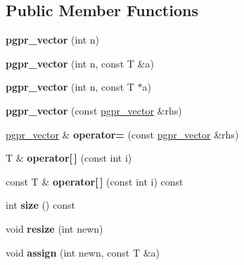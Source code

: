 \subsection*{Public Member Functions}
\begin{DoxyCompactItemize}
\item 
\hypertarget{classpgpr__vector_a4820d76d1faca86e6c3b2eab89b0b142}{{\bfseries pgpr\-\_\-vector} (int n)}\label{classpgpr__vector_a4820d76d1faca86e6c3b2eab89b0b142}

\item 
\hypertarget{classpgpr__vector_a7423667ee0fe3d6b37f648c20ff3e084}{{\bfseries pgpr\-\_\-vector} (int n, const T \&a)}\label{classpgpr__vector_a7423667ee0fe3d6b37f648c20ff3e084}

\item 
\hypertarget{classpgpr__vector_a50c96dc2fbd88b4a9a5ed2a807540422}{{\bfseries pgpr\-\_\-vector} (int n, const T $\ast$a)}\label{classpgpr__vector_a50c96dc2fbd88b4a9a5ed2a807540422}

\item 
\hypertarget{classpgpr__vector_a6135db2460ccc33b4a08b325c25b8517}{{\bfseries pgpr\-\_\-vector} (const \hyperlink{classpgpr__vector}{pgpr\-\_\-vector} \&rhs)}\label{classpgpr__vector_a6135db2460ccc33b4a08b325c25b8517}

\item 
\hypertarget{classpgpr__vector_a989b36f3d36a0ddcbfd44ec45d5b8bde}{\hyperlink{classpgpr__vector}{pgpr\-\_\-vector} \& {\bfseries operator=} (const \hyperlink{classpgpr__vector}{pgpr\-\_\-vector} \&rhs)}\label{classpgpr__vector_a989b36f3d36a0ddcbfd44ec45d5b8bde}

\item 
\hypertarget{classpgpr__vector_a3511ec2db47c6a7360286830310396e3}{T \& {\bfseries operator\mbox{[}$\,$\mbox{]}} (const int i)}\label{classpgpr__vector_a3511ec2db47c6a7360286830310396e3}

\item 
\hypertarget{classpgpr__vector_a790cda9d06b190713bf168c28788882c}{const T \& {\bfseries operator\mbox{[}$\,$\mbox{]}} (const int i) const }\label{classpgpr__vector_a790cda9d06b190713bf168c28788882c}

\item 
\hypertarget{classpgpr__vector_ac0674ee93caf2192637931f035aa5311}{int {\bfseries size} () const }\label{classpgpr__vector_ac0674ee93caf2192637931f035aa5311}

\item 
\hypertarget{classpgpr__vector_a0739a665c8294cc5a954f08d12ee0c3e}{void {\bfseries resize} (int newn)}\label{classpgpr__vector_a0739a665c8294cc5a954f08d12ee0c3e}

\item 
\hypertarget{classpgpr__vector_a3797b9b7f54060498c7a0fd4e2e2f6be}{void {\bfseries assign} (int newn, const T \&a)}\label{classpgpr__vector_a3797b9b7f54060498c7a0fd4e2e2f6be}

\end{DoxyCompactItemize}


